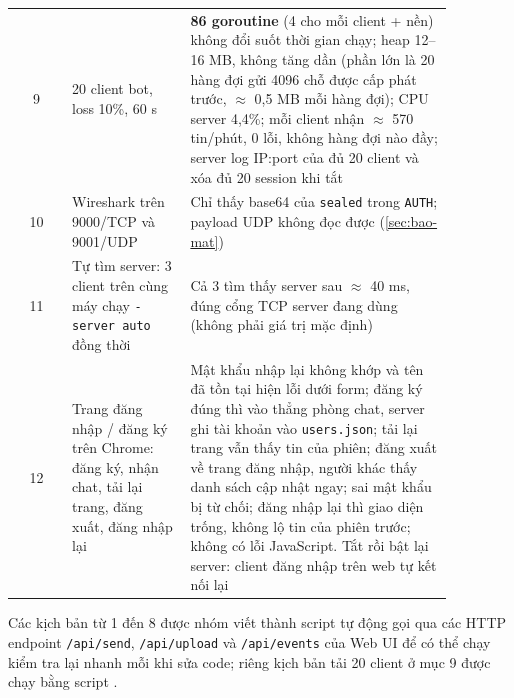 \begin{longtable}{c L{0.27\linewidth} L{0.6\linewidth}}
  9 & 20 client bot, loss 10\%, 60 s & \textbf{86 goroutine} (4 cho mỗi client + nền) không đổi suốt thời gian
  chạy; heap 12--16 MB, không tăng dần (phần lớn là 20 hàng đợi gửi 4096 chỗ được cấp phát trước, $\approx$
  0,5 MB mỗi hàng đợi); CPU server 4,4\%; mỗi client nhận $\approx$ 570 tin/phút, 0 lỗi, không hàng đợi nào
  đầy; server log IP:port của đủ 20 client và xóa đủ 20 session khi tắt \\
  10 & Wireshark trên 9000/TCP và 9001/UDP & Chỉ thấy base64 của \texttt{sealed} trong \texttt{AUTH}; payload
  UDP không đọc được (\cref{sec:bao-mat}) \\
  11 & Tự tìm server: 3 client trên cùng máy chạy \texttt{-server auto} đồng thời & Cả 3 tìm thấy server sau
  $\approx$ 40 ms, đúng cổng TCP server đang dùng (không phải giá trị mặc định) \\
  12 & Trang đăng nhập / đăng ký trên Chrome: đăng ký, nhận chat, tải lại trang, đăng xuất, đăng nhập lại &
  Mật khẩu nhập lại không khớp và tên đã tồn tại hiện lỗi dưới form; đăng ký đúng thì vào thẳng phòng chat, server
  ghi tài khoản vào \texttt{users.json}; tải lại trang vẫn thấy tin của phiên; đăng xuất về trang đăng nhập,
  người khác thấy danh sách cập nhật ngay; sai mật khẩu bị từ chối; đăng nhập lại thì giao diện trống, không lộ
  tin của phiên trước; không có lỗi JavaScript. Tắt rồi bật lại server: client đăng nhập trên web tự kết nối lại \\
  \bottomrule
\end{longtable}

Các kịch bản từ 1 đến 8 được nhóm viết thành script tự động gọi qua các HTTP endpoint \texttt{/api/send},
\texttt{/api/upload} và \texttt{/api/events} của Web UI để có thể chạy kiểm tra lại nhanh mỗi khi sửa code; riêng
kịch bản tải 20 client ở mục 9 được chạy bằng script .
